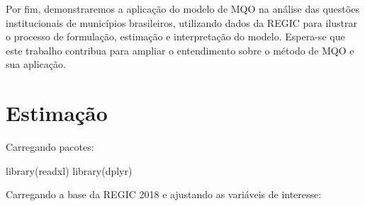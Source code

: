 \documentclass[a4paper,12pt]{article}
\newenvironment{Shaded}{\begin{snugshade}}{\end{snugshade}}
\newcommand{\FunctionTok}[1]{\textcolor[rgb]{0.39,0.29,0.61}{#1}}
\newcommand{\NormalTok}[1]{\textcolor[rgb]{0.12,0.11,0.11}{#1}}
\begin{document}
Por fim, demonstraremos a aplicação do modelo de MQO na análise das
questões institucionais de municípios brasileiros, utilizando dados da
REGIC para ilustrar o processo de formulação, estimação e interpretação
do modelo. Espera-se que este trabalho contribua para ampliar o
entendimento sobre o método de MQO e sua aplicação.

\hypertarget{estimauxe7uxe3o}{%
\section{Estimação}\label{estimauxe7uxe3o}}

Carregando pacotes:

\begin{Shaded}
\begin{Highlighting}[]
\FunctionTok{library}\NormalTok{(readxl)}
\FunctionTok{library}\NormalTok{(dplyr)}
\end{Highlighting}
\end{Shaded}

Carregando a base da REGIC 2018 e ajustando as variáveis de interesse:
\end{document}

